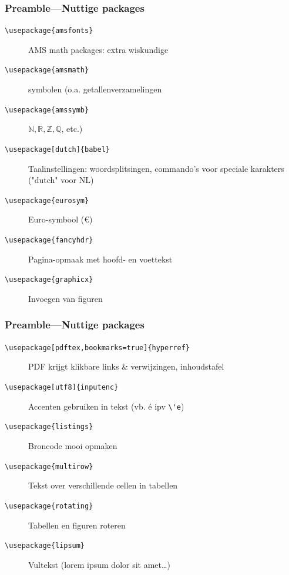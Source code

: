 \documentclass[aspectratio=169]{beamer}
\begin{document}
\begin{frame}[fragile]
  \frametitle{Preamble---Nuttige packages}
  
  \begin{description}
  \item[\texttt{\textbackslash{}usepackage\{amsfonts\}}] AMS math packages: extra wiskundige
  \item[\texttt{\textbackslash{}usepackage\{amsmath\}}] symbolen (o.a. getallenverzamelingen
  \item[\texttt{\textbackslash{}usepackage\{amssymb\}}] $\mathbb{N}, \mathbb{R}, \mathbb{Z}, \mathbb{Q}$, etc.)
  \pause
  \item[\texttt{\textbackslash{}usepackage[dutch]\{babel\}}] Taalinstellingen: woordsplitsingen, commando's voor speciale karakters ("dutch" voor NL)
  \pause
  \item[\texttt{\textbackslash{}usepackage\{eurosym\}}] Euro-symbool (\euro)
  \pause
  \item[\texttt{\textbackslash{}usepackage\{fancyhdr\}}] Pagina-opmaak met hoofd- en voettekst
  \pause
  \item[\texttt{\textbackslash{}usepackage\{graphicx\}}] Invoegen van figuren
  \end{description}
\end{frame}

\begin{frame}[fragile]
  \frametitle{Preamble---Nuttige packages}
  
  \begin{description}
  \item[\texttt{\textbackslash{}usepackage[pdftex,bookmarks=true]\{hyperref\}}] PDF krijgt klikbare links \& verwijzingen, inhoudstafel \pause
  \item[\texttt{\textbackslash{}usepackage[utf8]\{inputenc\}}] Accenten gebruiken in tekst (vb. é ipv \verb|\'e|) \pause
  \item[\texttt{\textbackslash{}usepackage\{listings\}}] Broncode mooi opmaken \pause
  \item[\texttt{\textbackslash{}usepackage\{multirow\}}] Tekst over verschillende cellen in tabellen \pause
  \item[\texttt{\textbackslash{}usepackage\{rotating\}}] Tabellen en figuren roteren \pause
  \item[\texttt{\textbackslash{}usepackage\{lipsum\}}] Vultekst (lorem ipsum dolor sit amet\ldots)
  \end{description}
\end{frame}
\end{document}
